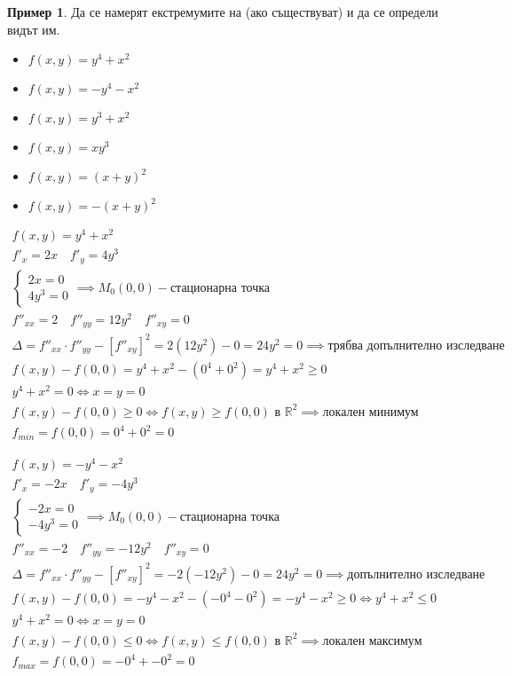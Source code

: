 \documentclass[a4paper,fleqn,12pt]{article}
\theoremstyle{definition}
\newtheorem{example}{Пример}[subsection]
\begin{document}
\begin{example}
Да се намерят екстремумите на (ако съществуват) и да се определи видът им. 
\begin{itemize}
\item $f(x,y) = y^4 + x^2$
\item $f(x,y) =  -y^4 - x^2$
\item $f(x,y) = y^3 + x^2$
\item $f(x,y) = xy^3$
\item $f(x,y) = (x+y)^2$
\item $f(x,y) = -(x+y)^2$
\end{itemize}
\end{example}

\begin{gather*}
f(x,y) = y^4 + x^2 \\
f'_x = 2x \quad f'_y = 4y^3  \\
\begin{cases}
2x = 0\\ 
4y^3 = 0
\end{cases} \implies M_0 (0,0) - \text{стационарна точка} \\
f''_{xx} = 2 \quad f''_{yy} = 12y^2 \quad f''_{xy} = 0 \\
\Delta = f''_{xx} \cdot f''_{yy} - \left[ f''_{xy} \right]^2 = 2(12y^2) - 0 = 24y^2 =  0 \implies \text{трябва допълнително изследване}\\ 
f(x,y) - f(0,0) = y^4 + x^2 - (0^4 + 0^2)  = y^4 + x^2 \geq 0 \\
y^4 + x^2 = 0 \iff x = y = 0 \\
f(x,y) - f(0,0) \geq 0 \iff f(x,y) \geq f(0,0) \text{ в } \mathbb{R}^2 \implies \text{локален минимум}\\
f_{min} = f(0,0) = 0^4 + 0^2 = 0
\end{gather*}

\begin{gather*}
f(x,y) = -y^4 - x^2\\
f'_x = -2x \quad f'_y = -4y^3  \\
\begin{cases}
-2x = 0\\ 
-4y^3 = 0
\end{cases} \implies M_0 (0,0) - \text{стационарна точка} \\
f''_{xx} = -2 \quad f''_{yy} = -12y^2 \quad f''_{xy} = 0 \\
\Delta = f''_{xx} \cdot f''_{yy} - \left[ f''_{xy} \right]^2 = -2(-12y^2) - 0 = 24y^2 =  0 \implies \text{допълнително изследване}\\ 
f(x,y) - f(0,0) = -y^4 - x^2 - ( -0^4 - 0^2)  = -y^4 - x^2 \geq 0  \iff y^4 + x^2 \leq 0 \\
y^4 + x^2 = 0 \iff  x = y = 0 \\
f(x,y) - f(0,0) \leq 0 \iff  f(x,y) \leq f(0,0) \text{ в } \mathbb{R}^2 \implies \text{локален максимум}\\
f_{max} = f(0,0) = -0^4 + -0^2 = 0
\end{gather*}
\end{document}

